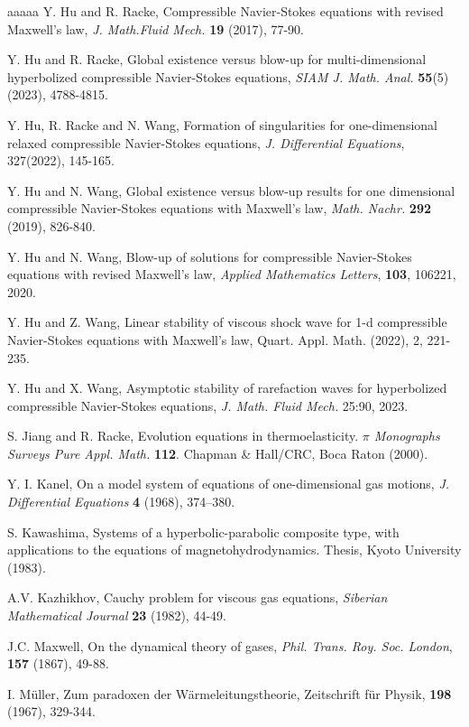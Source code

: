 \documentclass[10pt,reqno]{amsart}
\numberwithin{equation}{section}
\begin{document}
\begin{thebibliography}{aaaaa}
 Y. Hu and R. Racke, Compressible Navier-Stokes equations with revised Maxwell's law, {\it J. Math.Fluid Mech.} {\bf 19} (2017), 77-90.



Y. Hu and R. Racke, Global existence versus blow-up for multi-dimensional hyperbolized compressible Navier-Stokes equations, {\it SIAM J. Math. Anal.} {\bf 55}(5)(2023), 4788-4815. 

 Y. Hu, R. Racke and N. Wang, Formation of singularities for one-dimensional relaxed compressible Navier-Stokes equations, {\it J. Differential Equations},  327(2022), 145-165.

 Y. Hu and N. Wang, Global existence versus blow-up results for one dimensional compressible Navier-Stokes equations with Maxwell's law, {\it Math. Nachr.} {\bf 292} (2019), 826-840.

 Y. Hu and N. Wang, Blow-up of solutions for compressible Navier-Stokes equations with revised Maxwell's law, {\it Applied Mathematics Letters}, {\bf 103}, 106221, 2020.

 Y. Hu and Z. Wang, Linear stability of viscous shock wave for 1-d compressible Navier-Stokes equations with Maxwell’s law, Quart. Appl. Math. (2022), 2, 221-235.

 Y. Hu and X. Wang, Asymptotic stability of rarefaction waves for hyperbolized compressible Navier-Stokes equations, {\it J. Math. Fluid Mech.} 25:90, 2023.

  S. Jiang and R. Racke,  Evolution equations in thermoelasticity.
 {\it $\pi$ Monographs Surveys Pure Appl. Math.} {\bf 112}. Chapman \& Hall/CRC, Boca Raton (2000).
 
 
  Y. I. Kanel, On a model system of equations of one-dimensional gas motions, {\it J. Differential Equations} {\bf 4} (1968), 374–380.

 S. Kawashima, Systems of a hyperbolic-parabolic composite type, with applications to the equations of magnetohydrodynamics. Thesis, Kyoto University (1983).

 A.V. Kazhikhov, Cauchy problem for viscous gas equations, {\it Siberian Mathematical Journal} {\bf 23} (1982), 44-49.

 J.C. Maxwell, On the dynamical theory of gases, {\it Phil. Trans. Roy. Soc. London}, {\bf 157} (1867), 49-88.

 I. M\"uller, Zum paradoxen der W\"armeleitungstheorie, Zeitschrift f\"ur Physik, {\bf 198} (1967), 329-344.



\end{thebibliography}
\end{document}
